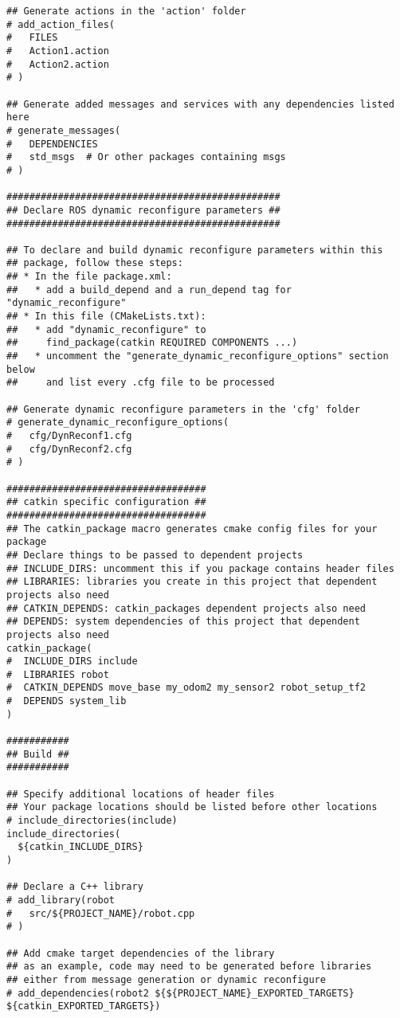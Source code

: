 \begin{lstlisting}
## Generate actions in the 'action' folder
# add_action_files(
#   FILES
#   Action1.action
#   Action2.action
# )

## Generate added messages and services with any dependencies listed here
# generate_messages(
#   DEPENDENCIES
#   std_msgs  # Or other packages containing msgs
# )

################################################
## Declare ROS dynamic reconfigure parameters ##
################################################

## To declare and build dynamic reconfigure parameters within this
## package, follow these steps:
## * In the file package.xml:
##   * add a build_depend and a run_depend tag for "dynamic_reconfigure"
## * In this file (CMakeLists.txt):
##   * add "dynamic_reconfigure" to
##     find_package(catkin REQUIRED COMPONENTS ...)
##   * uncomment the "generate_dynamic_reconfigure_options" section below
##     and list every .cfg file to be processed

## Generate dynamic reconfigure parameters in the 'cfg' folder
# generate_dynamic_reconfigure_options(
#   cfg/DynReconf1.cfg
#   cfg/DynReconf2.cfg
# )

###################################
## catkin specific configuration ##
###################################
## The catkin_package macro generates cmake config files for your package
## Declare things to be passed to dependent projects
## INCLUDE_DIRS: uncomment this if you package contains header files
## LIBRARIES: libraries you create in this project that dependent projects also need
## CATKIN_DEPENDS: catkin_packages dependent projects also need
## DEPENDS: system dependencies of this project that dependent projects also need
catkin_package(
#  INCLUDE_DIRS include
#  LIBRARIES robot
#  CATKIN_DEPENDS move_base my_odom2 my_sensor2 robot_setup_tf2
#  DEPENDS system_lib
)

###########
## Build ##
###########

## Specify additional locations of header files
## Your package locations should be listed before other locations
# include_directories(include)
include_directories(
  ${catkin_INCLUDE_DIRS}
)

## Declare a C++ library
# add_library(robot
#   src/${PROJECT_NAME}/robot.cpp
# )

## Add cmake target dependencies of the library
## as an example, code may need to be generated before libraries
## either from message generation or dynamic reconfigure
# add_dependencies(robot2 ${${PROJECT_NAME}_EXPORTED_TARGETS} ${catkin_EXPORTED_TARGETS})


\end{lstlisting}
